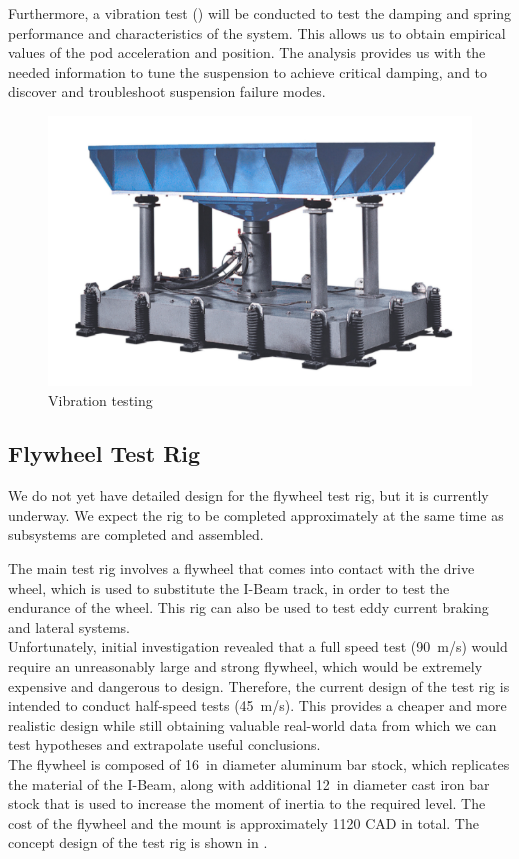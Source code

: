 \documentclass[main.tex]{subfiles}
\begin{document}
    Furthermore, a vibration test () will be conducted to test the damping and spring performance and characteristics of the system. This allows us to obtain empirical values of the pod acceleration and position. The analysis provides us with the needed information to tune the suspension to achieve critical damping, and to discover and troubleshoot suspension failure modes.\\

     \begin{figure}
           \centering
       \includegraphics[width=0.5\linewidth]{images/vibra}
       \caption{Vibration testing}
       \label{fig:vibra}
   \end{figure}
    
    \subsection{Flywheel Test Rig}
    We do not yet have detailed design for the flywheel test rig, but it is currently underway. We expect the rig to be completed approximately at the same time as subsystems are completed and assembled.
    
	The main test rig involves a flywheel that comes into contact with the drive wheel, which is used to substitute the I-Beam track, in order to test the endurance of the wheel. This rig can also be used to test eddy current braking and lateral systems.\\
    
    Unfortunately, initial investigation revealed that a full speed test (\SI{90}{m/s}) would require an unreasonably large and strong flywheel, which would be extremely expensive and dangerous to design. Therefore, the current design of the test rig is intended to conduct half-speed tests (\approx \SI{45}{m/s}). This provides a cheaper and more realistic design while still obtaining valuable real-world data from which we can test hypotheses and extrapolate useful conclusions.\\
    
    The flywheel is composed of \SI{16}{in} diameter aluminum bar stock, which replicates the material of the I-Beam, along with additional \SI{12}{in} diameter cast iron bar stock that is used to increase the moment of inertia to the required level. The cost of the flywheel and the mount is approximately 1120 CAD in total. The concept design of the test rig is shown in .\\
    
\end{document}
